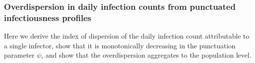 

\clearpage
\subsubsection{Overdispersion in daily infection counts from punctuated infectiousness profiles}
\label{sec:supp_daily_overdispersion}

Here we derive the index of dispersion of the daily infection count attributable to a single infector, show that it is monotonically decreasing in the punctuation parameter $\psi$, and show that the overdispersion aggregates to the population level.


